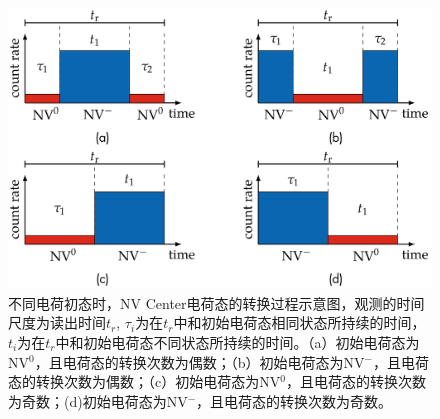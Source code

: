 \documentclass[type = bachelor]{whu-thesis}
\begin{document}
\begin{figure}
  \centering
  \includegraphics[width=1.0\textwidth]{figures/Chapter 2/Charge Conversion.png}
  \caption[不同电荷初态时，NV Center电荷态的转换过程示意图]{不同电荷初态时，NV Center电荷态的转换过程示意图，观测的时间尺度为读出时间$t_r$, $\tau_i$为在$t_r$中和初始电荷态相同状态所持续的时间，$t_i$为在$t_r$中和初始电荷态不同状态所持续的时间。（a）初始电荷态为NV$^0$，且电荷态的转换次数为偶数；（b）初始电荷态为NV$^-$，且电荷态的转换次数为偶数；（c）初始电荷态为NV$^0$，且电荷态的转换次数为奇数；(d)初始电荷态为NV$^-$，且电荷态的转换次数为奇数。}
  \label{fig: Charge Conversion}
\end{figure}
\end{document}
